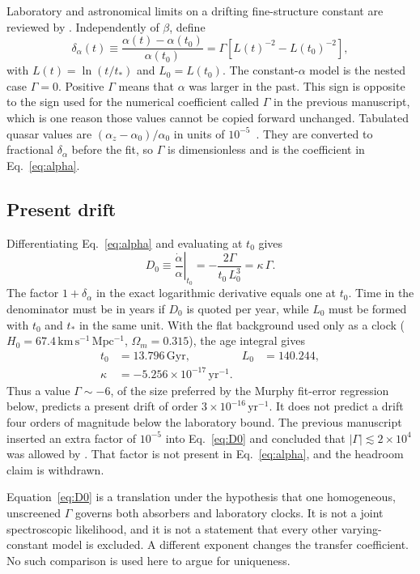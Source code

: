 Laboratory and astronomical limits on a drifting fine-structure constant are reviewed by \citep{Uzan2003,Martins2017}.
Independently of $\beta$, define
\begin{equation}
  \delta_{\alpha}(t)
  \equiv\frac{\alpha(t)-\alpha(t_{0})}{\alpha(t_{0})}
  =\Gamma\left[L(t)^{-2}-L(t_{0})^{-2}\right],
  \label{eq:alpha}
\end{equation}
with $L(t)=\ln(t/t_{*})$ and $L_{0}=L(t_{0})$.
The constant-$\alpha$ model is the nested case $\Gamma=0$.
Positive $\Gamma$ means that $\alpha$ was larger in the past.
This sign is opposite to the sign used for the numerical coefficient called $\Gamma$ in the previous manuscript, which is one reason those values cannot be copied forward unchanged.
Tabulated quasar values are $(\alpha_{z}-\alpha_{0})/\alpha_{0}$ in units of $10^{-5}$~\citep{Murphy2003}.
They are converted to fractional $\delta_{\alpha}$ before the fit, so $\Gamma$ is dimensionless and is the coefficient in Eq.~\eqref{eq:alpha}.

\subsection{Present drift}
\label{sec:clock}

Differentiating Eq.~\eqref{eq:alpha} and evaluating at $t_{0}$ gives
\begin{equation}
  D_{0}
  \equiv\left.\frac{\dot\alpha}{\alpha}\right|_{t_{0}}
  =-\frac{2\Gamma}{t_{0}\,L_{0}^{3}}
  =\kappa\,\Gamma.
  \label{eq:D0}
\end{equation}
The factor $1+\delta_{\alpha}$ in the exact logarithmic derivative equals one at $t_{0}$.
Time in the denominator must be in years if $D_{0}$ is quoted per year, while $L_{0}$ must be formed with $t_{0}$ and $t_{*}$ in the same unit.
With the flat background used only as a clock ($H_{0}=67.4\,\mathrm{km\,s^{-1}\,Mpc^{-1}}$, $\Omega_{m}=0.315$), the age integral gives
\begin{align}
  t_{0}&=13.796\,\mathrm{Gyr},
  &
  L_{0}&=140.244,
  \nonumber\\
  \kappa&=-5.256\times10^{-17}\,\mathrm{yr}^{-1}.
  \label{eq:kappa}
\end{align}
Thus a value $\Gamma\sim-6$, of the size preferred by the Murphy fit-error regression below, predicts a present drift of order $3\times10^{-16}\,\mathrm{yr}^{-1}$.
It does not predict a drift four orders of magnitude below the laboratory bound.
The previous manuscript inserted an extra factor of $10^{-5}$ into Eq.~\eqref{eq:D0} and concluded that $|\Gamma|\lesssim2\times10^{4}$ was allowed by \citep{Rosenband2008}.
That factor is not present in Eq.~\eqref{eq:alpha}, and the headroom claim is withdrawn.

Equation~\eqref{eq:D0} is a translation under the hypothesis that one homogeneous, unscreened $\Gamma$ governs both absorbers and laboratory clocks.
It is not a joint spectroscopic likelihood, and it is not a statement that every other varying-constant model is excluded.
A different exponent changes the transfer coefficient.
No such comparison is used here to argue for uniqueness.
